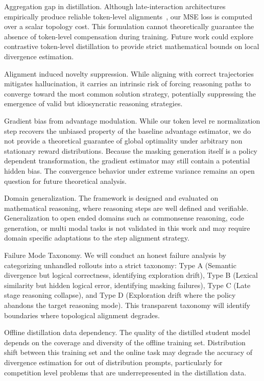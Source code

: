 \documentclass[conference]{IEEEtran}
\begin{document}
Aggregation gap in distillation. Although late-interaction architectures empirically produce reliable token-level alignments~\cite{b10}, our MSE loss is computed over a scalar topology cost. This formulation cannot theoretically guarantee the absence of token-level compensation during training. Future work could explore contrastive token-level distillation to provide strict mathematical bounds on local divergence estimation.

Alignment induced novelty suppression. While aligning with correct trajectories mitigates hallucination, it carries an intrinsic risk of forcing reasoning paths to converge toward the most common solution strategy, potentially suppressing the emergence of valid but idiosyncratic reasoning strategies.

Gradient bias from advantage modulation. While our token level re normalization step recovers the unbiased property of the baseline advantage estimator, we do not provide a theoretical guarantee of global optimality under arbitrary non stationary reward distributions. Because the masking generation itself is a policy dependent transformation, the gradient estimator may still contain a potential hidden bias. The convergence behavior under extreme variance remains an open question for future theoretical analysis.

Domain generalization. The framework is designed and evaluated on mathematical reasoning, where reasoning steps are well defined and verifiable. Generalization to open ended domains such as commonsense reasoning, code generation, or multi modal tasks is not validated in this work and may require domain specific adaptations to the step alignment strategy.

Failure Mode Taxonomy. We will conduct an honest failure analysis by categorizing unhandled rollouts into a strict taxonomy: Type A (Semantic divergence but logical correctness, identifying exploration drift), Type B (Lexical similarity but hidden logical error, identifying masking failures), Type C (Late stage reasoning collapse), and Type D (Exploration drift where the policy abandons the target reasoning mode). This transparent taxonomy will identify boundaries where topological alignment degrades.

Offline distillation data dependency. The quality of the distilled student model depends on the coverage and diversity of the offline training set. Distribution shift between this training set and the online task may degrade the accuracy of divergence estimation for out of distribution prompts, particularly for competition level problems that are underrepresented in the distillation data.
\end{document}
